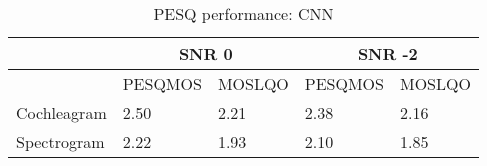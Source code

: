 \begin{itemize}
\begin{table}[!htbp]
\begin{tabular}{ |p{8cm}|p{1.7cm}|p{1.7cm}|p{1.7cm}|p{1.7cm}|  }
\hline
\cellcolor{black} & \multicolumn{2}{|c|}{SNR 0} & \multicolumn{2}{|c|}{SNR -2}\\
\hline
\cellcolor{black} & PESQMOS & MOSLQO & PESQMOS & MOSLQO\\
\hline
\cellcolor[HTML]{ADD8E6}Cochleagram	& \cellcolor[HTML]{ADD8E6}2.50	& \cellcolor[HTML]{ADD8E6}2.21	& \cellcolor{yellow}2.38	& \cellcolor{yellow}2.16\\
\hline
Spectrogram	& 2.22	& 1.93	& 2.10	& 1.85\\
\hline
\end{tabular}
\caption{PESQ performance: CNN}
\label{tab:cnn_pesq}
\end{table}
\end{itemize}